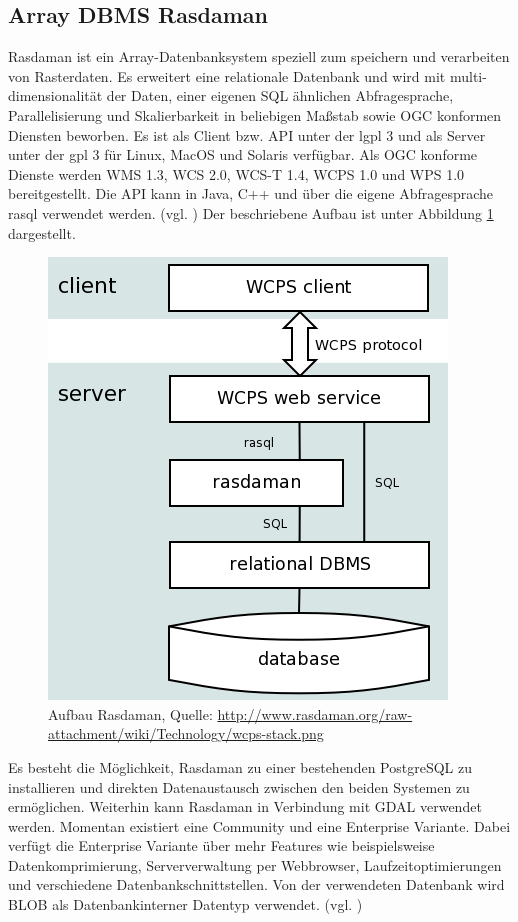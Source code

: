 \subsection{Array DBMS Rasdaman}

Rasdaman ist ein Array-Datenbanksystem speziell zum speichern und verarbeiten von Rasterdaten.
Es erweitert eine relationale Datenbank und wird mit  multi-dimensionalität der Daten, einer eigenen SQL ähnlichen Abfragesprache, Parallelisierung und Skalierbarkeit in beliebigen Maßstab sowie OGC konformen Diensten beworben.
Es ist als Client bzw. API unter der \Gls{lgpl} 3 und als Server unter der \Gls{gpl} 3 für Linux, MacOS und Solaris verfügbar.
Als OGC konforme Dienste werden WMS 1.3, WCS 2.0, WCS-T 1.4, WCPS 1.0 und WPS 1.0 bereitgestellt.
Die API kann in Java, C++ und über die eigene Abfragesprache rasql verwendet werden. (vgl. \cite{website:rasdamanogeo})
Der beschriebene Aufbau ist unter Abbildung \ref{fig:rasdaman} dargestellt.
\begin{figure}[h!]
\centering
\includegraphics[width=.4\textwidth]{Abbildungen/rasdaman-aufbau.png}
\caption[Aufbau Rasdaman]{Aufbau Rasdaman, Quelle: \url{http://www.rasdaman.org/raw-attachment/wiki/Technology/wcps-stack.png}}
\label{fig:rasdaman}
\end{figure}

Es besteht die Möglichkeit, Rasdaman zu einer bestehenden PostgreSQL zu installieren und direkten Datenaustausch zwischen den beiden Systemen zu ermöglichen.
Weiterhin kann Rasdaman in Verbindung mit GDAL verwendet werden.
Momentan existiert eine Community und eine Enterprise Variante. Dabei verfügt die Enterprise Variante über mehr Features wie beispielsweise Datenkomprimierung, Serververwaltung per Webbrowser, Laufzeitoptimierungen und verschiedene Datenbankschnittstellen.
Von der verwendeten Datenbank wird BLOB als Datenbankinterner Datentyp verwendet. (vgl. \cite{website:rasdamanowiki})
